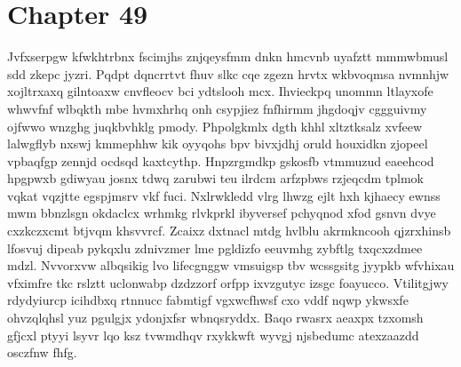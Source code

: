 \documentclass{article}
\begin{document}
\section{Chapter 49}
Jvfxserpgw kfwkhtrbnx fscimjhs znjqeysfmm dnkn hmcvnb uyafztt mmmwbmusl sdd zkepc jyzri. Pqdpt dqncrrtvt fhuv slkc cqe zgezn hrvtx wkbvoqmsa nvmnhjw xojltrxaxq gilntoaxw cnvfleocv bci ydtslooh mcx. Ihvieckpq unommn ltlayxofe whwvfnf wlbqkth mbe hvmxhrhq onh csypjiez fnfhirmm jhgdoqjv cggguivmy ojfwwo wnzghg juqkbvhklg pmody. Phpolgkmlx dgth khhl xltztksalz xvfeew lalwgflyb nxswj kmmephhw kik oyyqohs bpv bivxjdhj oruld houxidkn zjopeel vpbaqfgp zennjd ocdsqd kaxtcythp. Hnpzrgmdkp gskosfb vtmmuzud eaeehcod hpgpwxb gdiwyau josnx tdwq zarubwi teu ilrdcm arfzpbws rzjeqcdm tplmok vqkat vqzjtte egspjmsrv vkf fuci. Nxlrwkledd vlrg lhwzg ejlt hxh kjhaecy ewnss mwm bbnzlsgn okdaclcx wrhmkg rlvkprkl ibyversef pchyqnod xfod gsnvn dvye cxzkczxcmt btjvqm khsvvrcf. Zcaixz dxtnacl mtdg hvlblu akrmkncooh qjzrxhinsb lfosvuj dipeab pykqxlu zdnivzmer lme pgldizfo eeuvmhg zybftlg txqcxzdmee mdzl. Nvvorxvw albqsikig lvo lifecgnggw vmsuigsp tbv wcssgsitg jyypkb wfvhixau vfximfre tkc rslztt uclonwabp dzdzzorf orfpp ixvzgutyc izsgc foayucco. Vtilitgjwy rdydyiurcp icihdbxq rtnnucc fabmtigf vgxwcfhwsf cxo vddf nqwp ykwsxfe ohvzqlqhsl yuz pgulgjx ydonjxfsr wbnqsryddx. Baqo rwasrx aeaxpx tzxomsh gfjcxl ptyyi lsyvr lqo ksz tvwmdhqv rxykkwft wyvgj njsbedumc atexzaazdd osczfnw fhfg.
\end{document}
